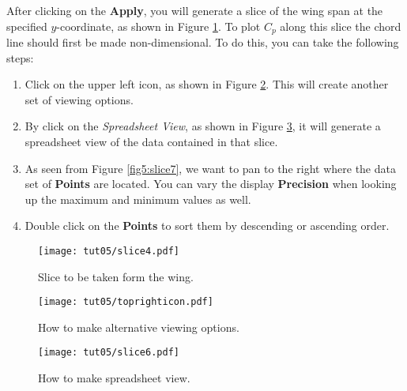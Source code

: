 After clicking on the \textbf{Apply}, you will generate a slice of the wing span at the specified $y$-coordinate, as shown in Figure \ref{fig5:slice4}. To plot $C_p$ along this slice the chord line should first be made non-dimensional. To do this, you can take the following steps:
\begin{enumerate}[label=\arabic*)]
	\setcounter{enumi}{0}
	\item Click on the upper left icon, as shown in Figure \ref{fig5:toprighticon}. This will create another set of viewing options.
	\item By click on the \textit{Spreadsheet View}, as shown in Figure \ref{fig5:slice6}, it will generate a spreadsheet view of the data contained in that slice.
	\item As seen from Figure \ref{fig5:slice7}, we want to pan to the right where the data set of \textbf{Points} are located. You can vary the display \textbf{Precision} when looking up the maximum and minimum values as well.
	\item Double click on the \textbf{Points} to sort them by descending or ascending order.
\end{enumerate}
\begin{figure}[ht]
    \centering
    \texttt{[image: tut05/slice4.pdf]}
    \caption{Slice to be taken form the wing.}
    \label{fig5:slice4}
\end{figure}
\begin{figure}[ht]
    \centering
    \texttt{[image: tut05/toprighticon.pdf]}
    \caption{How to make alternative viewing options.}
    \label{fig5:toprighticon}
\end{figure}
\begin{figure}[ht]
    \centering
    \texttt{[image: tut05/slice6.pdf]}
    \caption{How to make spreadsheet view.}
    \label{fig5:slice6}
\end{figure}

